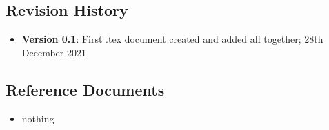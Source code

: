 \newpage
\subsection{Revision History}
\begin{itemize}
	\item \textbf{Version 0.1}: First .tex document created and added all together; 28th December 2021
\end{itemize}

\newpage
\subsection{Reference Documents}
\begin{itemize}
	\item nothing
\end{itemize}

